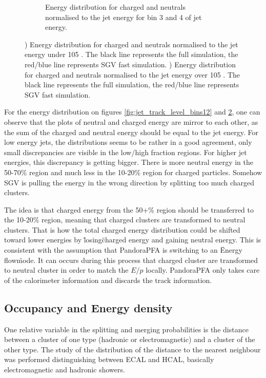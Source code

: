 \begin{figure}[htbp!]
\begin{subfigure}[t]{0.45\textwidth}
    \caption{Energy distribution for charged and neutrals normalised to the jet energy for bin 3 and 4 of jet energy.} \label{fig:jet_track_level_bins34}
  \end{subfigure}
  \caption{) Energy distribution for charged and neutrals normalised to the jet energy under 105 \GeV. The black line represents the full simulation, the red/blue line represents SGV fast simulation. ) Energy distribution for charged and neutrals normalised to the jet energy over 105 \GeV. The black line represents the full simulation, the red/blue line represents SGV fast simulation.}
\end{figure}

For the energy distribution on figures \ref{fig:jet_track_level_bins12} and \ref{fig:jet_track_level_bins34}, one can observe that the plots of neutral and charged energy are mirror to each other, as the sum of the charged and neutral energy should be equal to the jet energy. For low energy jets, the distributions seems to be rather in a good agreement, only small discrepancies are visible in the low/high fraction regions. For higher jet energies, this discrepancy is getting bigger. There is more neutral energy in the 50-70\% region and much less in the 10-20\% region for charged particles. Somehow SGV is pulling the energy in the wrong direction by splitting too much charged clusters.

The idea is that charged energy from the 50+\% region should be transferred to the 10-20\% region, meaning that charged clusters are transformed to neutral clusters. That is how the total charged energy distribution could be shifted toward lower energies by \"losing\" charged energy and gaining neutral energy. This is consistent with the assumption that PandoraPFA is switching to an \"Energy flow\" mode. It can occurs during this process that charged cluster are transformed to neutral cluster in order to match the $E/p$ locally. PandoraPFA only takes care of the calorimeter information and discards the track information.

\subsection{Occupancy and Energy density}

One relative variable in the splitting and merging probabilities is the distance between a cluster of one type (hadronic or electromagnetic) and a cluster of the other type. The study of the distribution of the distance to the nearest neighbour was performed distinguishing between ECAL and HCAL, basically electromagnetic and hadronic showers.

